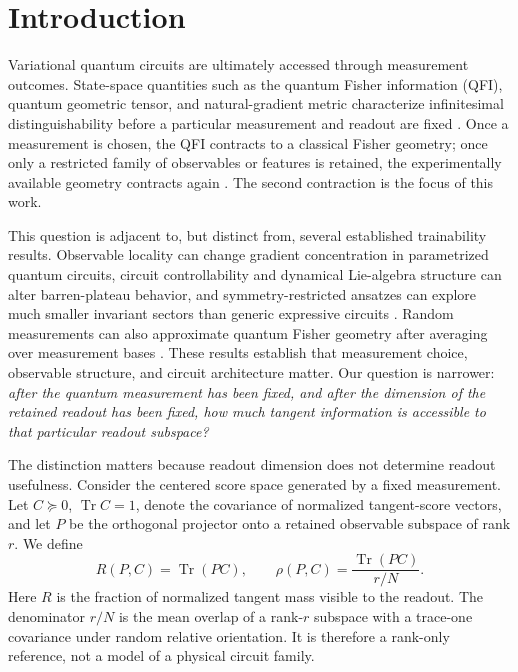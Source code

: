 \documentclass[aps,pra,reprint,superscriptaddress,nofootinbib,longbibliography]{revtex4-2}
\newcommand{\Tr}{\operatorname{Tr}}
\begin{document}
\maketitle

\section{Introduction}

Variational quantum circuits are ultimately accessed through measurement outcomes. State-space quantities such as the quantum Fisher information (QFI), quantum geometric tensor, and natural-gradient metric characterize infinitesimal distinguishability before a particular measurement and readout are fixed \cite{BraunsteinCaves1994,Stokes2020,Haug2021}. Once a measurement is chosen, the QFI contracts to a classical Fisher geometry; once only a restricted family of observables or features is retained, the experimentally available geometry contracts again \cite{BraunsteinCaves1994,HottaOzawa2004,LuLuoOh2012}. The second contraction is the focus of this work.

This question is adjacent to, but distinct from, several established trainability results. Observable locality can change gradient concentration in parametrized quantum circuits, circuit controllability and dynamical Lie-algebra structure can alter barren-plateau behavior, and symmetry-restricted ansatzes can explore much smaller invariant sectors than generic expressive circuits \cite{Cerezo2021,UvarovBiamonte2021,Larocca2022,HolmesSharma2022}. Random measurements can also approximate quantum Fisher geometry after averaging over measurement bases \cite{LuSha2025}. These results establish that measurement choice, observable structure, and circuit architecture matter. Our question is narrower: \emph{after the quantum measurement has been fixed, and after the dimension of the retained readout has been fixed, how much tangent information is accessible to that particular readout subspace?}

The distinction matters because readout dimension does not determine readout usefulness. Consider the centered score space generated by a fixed measurement. Let $C\succeq0$, $\Tr C=1$, denote the covariance of normalized tangent-score vectors, and let $P$ be the orthogonal projector onto a retained observable subspace of rank $r$. We define
\begin{equation}
R(P,C)=\Tr(PC),
\qquad
\rho(P,C)=\frac{\Tr(PC)}{r/N}.
\label{eq:def-rho}
\end{equation}
Here $R$ is the fraction of normalized tangent mass visible to the readout. The denominator $r/N$ is the mean overlap of a rank-$r$ subspace with a trace-one covariance under random relative orientation. It is therefore a rank-only reference, not a model of a physical circuit family.
\end{document}
